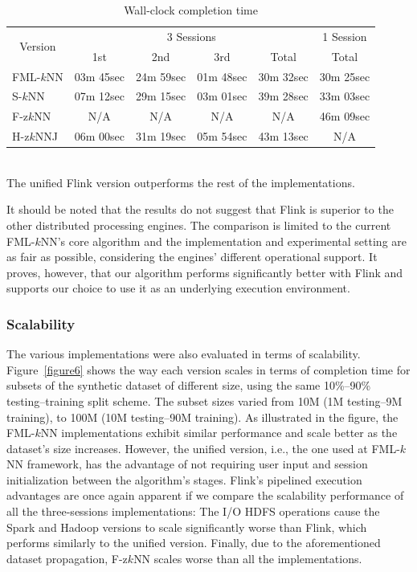 \begin{table}[h!]
\centering
\caption{Wall-clock completion time}
\label{table1}
\begin{tabular}{l|c|c|c|c||c}
\multicolumn{1}{c|}{\multirow{2}{*}{Version}} & \multicolumn{4}{c||}{3 Sessions}             & 1 Session  \\ \cline{2-6} 
\multicolumn{1}{c|}{}                         & 1st      & 2nd      & 3rd      & Total    & Total    \\ \hline
FML-$k$NN                                         & 03m 45sec & 24m 59sec & 01m 48sec & 30m 32sec & 30m 25sec \\ \hline
S-$k$NN                                         & 07m 12sec & 29m 15sec & 03m 01sec & 39m 28sec & 33m 03sec \\ \hline
F-z$k$NN                                         & N/A & N/A & N/A & N/A & 46m 09sec \\ \hline
H-z$k$NNJ                                       & 06m 00sec & 31m 19sec & 05m 54sec & 43m 13sec & N/A     
\end{tabular}
\\[6pt]
The unified Flink version outperforms the rest of the implementations.
\end{table}

It should be noted that the results do not suggest that Flink is superior to the other distributed processing engines. The comparison is limited to the current FML-$k$NN's core algorithm and the implementation and experimental setting are as fair as possible, considering the engines' different operational support. It proves, however, that our algorithm performs significantly better with Flink and supports our choice to use it as an underlying execution environment.

\subsubsection{Scalability}
\label{subsubsec:scalability}
The various implementations were also evaluated in terms of scalability. Figure~\ref{figure6} shows the way each version scales in terms of completion time for subsets of the synthetic dataset of different size, using the same 10\%--90\% testing--training split scheme. The subset sizes varied from 10M (1M testing--9M training), to 100M (10M testing--90M training). As illustrated in the figure, the FML-$k$NN implementations exhibit similar performance and scale better as the dataset's size increases. However, the unified version, i.e., the one used at FML-$k$NN framework, has the advantage of not requiring user input and session initialization between the algorithm's stages. Flink's pipelined execution advantages are once again apparent if we compare the scalability performance of all the three-sessions implementations: The I/O HDFS operations cause the Spark and Hadoop versions to scale significantly worse than Flink, which performs similarly to the unified version. Finally, due to the aforementioned dataset propagation, F-z$k$NN scales worse than all the implementations.

